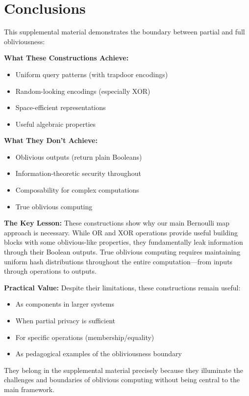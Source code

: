\documentclass[11pt,final,hidelinks]{article}
\begin{document}
\section{Conclusions}

This supplemental material demonstrates the boundary between partial and full obliviousness:

\textbf{What These Constructions Achieve:}
\begin{itemize}
    \item Uniform query patterns (with trapdoor encodings)
    \item Random-looking encodings (especially XOR)
    \item Space-efficient representations
    \item Useful algebraic properties
\end{itemize}

\textbf{What They Don't Achieve:}
\begin{itemize}
    \item Oblivious outputs (return plain Booleans)
    \item Information-theoretic security throughout
    \item Composability for complex computations
    \item True oblivious computing
\end{itemize}

\textbf{The Key Lesson:}
These constructions show why our main Bernoulli map approach is necessary. While OR and XOR operations provide useful building blocks with some oblivious-like properties, they fundamentally leak information through their Boolean outputs. True oblivious computing requires maintaining uniform hash distributions throughout the entire computation—from inputs through operations to outputs.

\textbf{Practical Value:}
Despite their limitations, these constructions remain useful:
\begin{itemize}
    \item As components in larger systems
    \item When partial privacy is sufficient
    \item For specific operations (membership/equality)
    \item As pedagogical examples of the obliviousness boundary
\end{itemize}

They belong in the supplemental material precisely because they illuminate the challenges and boundaries of oblivious computing without being central to the main framework.


\end{document}
